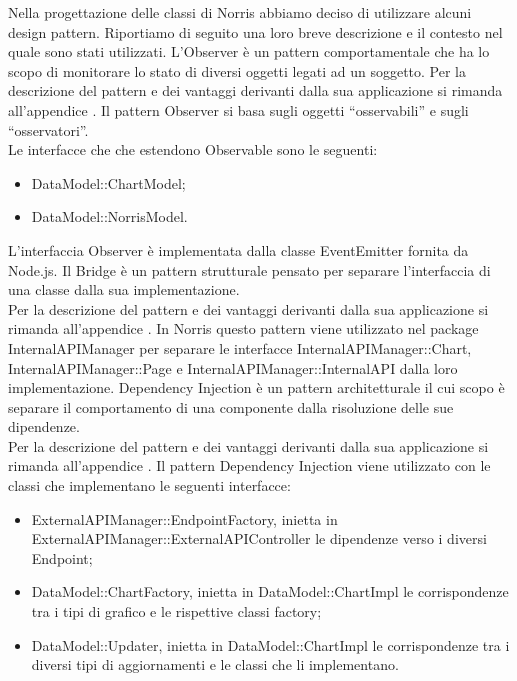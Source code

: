 			Nella progettazione delle classi di Norris abbiamo deciso di utilizzare alcuni design pattern. Riportiamo di seguito una loro breve descrizione e il contesto nel quale sono stati utilizzati.
				L'Observer è un pattern comportamentale che ha lo scopo di monitorare lo stato di diversi oggetti legati ad un soggetto.
				Per la descrizione del pattern e dei vantaggi derivanti dalla sua applicazione si rimanda all'appendice .
					Il pattern Observer si basa sugli oggetti “osservabili” e sugli “osservatori”.\\
					Le interfacce che che estendono Observable sono le seguenti:
					\begin{itemize}
						\item DataModel::ChartModel;
						\item DataModel::NorrisModel.
					\end{itemize}
					L'interfaccia Observer è implementata dalla classe EventEmitter fornita da Node.js.
				Il Bridge è un pattern strutturale pensato per separare l'interfaccia di una classe dalla sua implementazione.\\
				Per la descrizione del pattern e dei vantaggi derivanti dalla sua applicazione si rimanda all'appendice .
					In Norris questo pattern viene utilizzato nel package InternalAPIManager per separare le interfacce InternalAPIManager::Chart, InternalAPIManager::Page e InternalAPIManager::InternalAPI dalla loro implementazione.
				Dependency Injection è un pattern architetturale il cui scopo è separare il comportamento di una componente dalla risoluzione delle sue dipendenze.\\
				Per la descrizione del pattern e dei vantaggi derivanti dalla sua applicazione si rimanda all'appendice .
					Il pattern Dependency Injection viene utilizzato con le classi che implementano le seguenti interfacce:
					\begin{itemize}
						\item ExternalAPIManager::EndpointFactory, inietta in ExternalAPIManager::ExternalAPIController le dipendenze verso i diversi Endpoint;
						\item DataModel::ChartFactory, inietta in DataModel::ChartImpl le  corrispondenze tra i tipi di grafico e le rispettive classi factory;
						\item DataModel::Updater, inietta in DataModel::ChartImpl le corrispondenze tra i diversi tipi di aggiornamenti e le classi che li implementano.
					\end{itemize}
